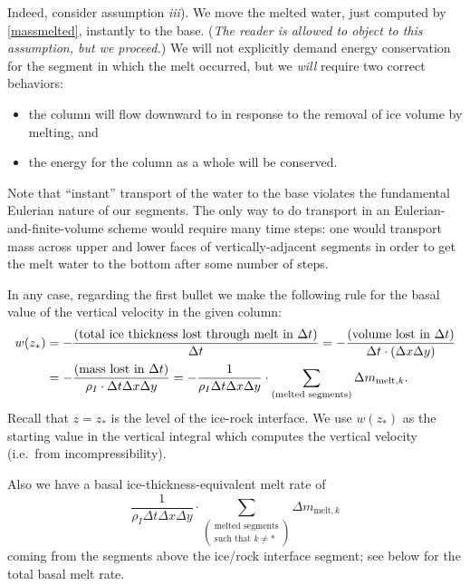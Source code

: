\documentclass[12pt,final]{amsart}%
\theoremstyle{plain}
\theoremstyle{definition}
\theoremstyle{remark}
\begin{document}
Indeed, consider assumption \emph{iii}).  We move the melted water, just computed by \eqref{massmelted}, instantly to the base.  (\emph{The reader is allowed to object to this assumption, but we proceed.})  We will not explicitly demand energy conservation for the segment in which the melt occurred, but we \emph{will} require two correct behaviors:\begin{itemize}
\item the column will flow downward to in response to the removal of ice volume by melting, and
\item the energy for the column as a whole will be conserved.
\end{itemize}
Note that ``instant'' transport of the water to the base violates the fundamental Eulerian nature of our segments.  The only way to do transport in an Eulerian-and-finite-volume scheme would require many time steps: one would transport mass across upper and lower faces of vertically-adjacent segments in order to get the melt water to the bottom after some number of steps.

In any case, regarding the first bullet we make the following rule for the basal value of the vertical velocity in the given column:
\begin{align}\label{basevertvelrule}
w(z_\ast) &= -\frac{(\text{total ice thickness lost through melt in }\Delta t)}{\Delta t} = -\frac{(\text{volume lost in }\Delta t)}{\Delta t\cdot(\Delta x \Delta y)}  \\
    &= -\frac{(\text{mass lost in }\Delta t)}{\rho_I\cdot \Delta t\Delta x \Delta y} = - \frac{1}{\rho_I \Delta t\Delta x \Delta y}\cdot \sum_{(\text{melted segments})}  \Delta m_{\text{melt},k}. \notag
\end{align}
Recall that $z=z_\ast$ is the level of the ice-rock interface.  We use $w(z_\ast)$ as the starting value in the vertical integral which computes the vertical velocity (i.e.~from incompressibility).

Also we have a basal ice-thickness-equivalent melt rate of
    $$\frac{1}{\rho_I\Delta t\Delta x \Delta y}\cdot \sum_{\left(\begin{smallmatrix}\text{melted segments}\\ \text{such that } k\ne \ast\end{smallmatrix}\right)}  \Delta m_{\text{melt},k}$$
coming from the segments above the ice/rock interface segment; see below for the total basal melt rate.
\end{document}
